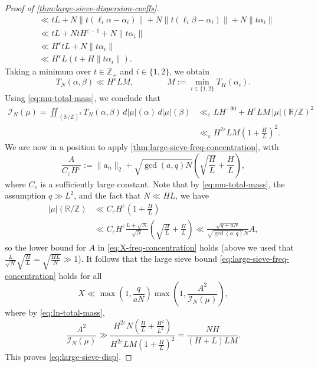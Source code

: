 \documentclass[reqno,11pt]{amsart}
\theoremstyle{remark}
\numberwithin{equation}{section}
\newcommand{\Z}{\mathbb{Z}}
\newcommand{\R}{\mathbb{R}}
\newcommand{\mI}{\mathcal{I}}
\newcommand{\eps}{\varepsilon}
\begin{document}
\begin{proof}[Proof of \cref{thm:large-sieve-dispersion-coeffs}]
\[\begin{aligned}
    &\ll 
    tL + N \|t(\ell_i \alpha - \alpha_i)\| + N \|t(\ell_i \beta - \alpha_i)\| + N \|t\alpha_i\|
    \\
    &\ll
    tL + N tH^{\eps-1} + N \|t\alpha_i\|
    \\
    &\ll 
    H^\eps t L + N\|t\alpha_i\|
    \\
    &\ll
    H^\eps L \left(t + H\|t\alpha_i\|\right).
\end{aligned}
\]
Taking a minimum over $t \in \Z_+$ and $i \in \{1, 2\}$, we obtain
\[
    T_N(\alpha, \beta) \ll H^\eps L M,
    \qquad\qquad 
    M := \min_{i \in \{1, 2\}} T_{H}(\alpha_i).
\]
Using \cref{eq:mu-total-mass}, we conclude that
\begin{equation} \label{eq:In-total-mass}
\begin{aligned}
    \mI_{N}(\mu) 
    =
    \iint_{(\R/\Z)^2} T_{N}(\alpha, \beta)\, d|\mu|(\alpha)\, d|\mu|(\beta) 
    &\ll_{\eps}
    L H^{-90}
    +
    H^\eps L M\, |\mu|(\R/\Z)^2
    \\
    &\ll_{\eps} 
    H^{2\eps} L M\left(1 + \frac{H}{L}\right)^2.
\end{aligned}
\end{equation}
We are now in a position to apply \cref{thm:large-sieve-freq-concentration}, with
\[
    \frac{A}{C_\eps H^\eps} := \|a_n\|_2 + \sqrt{\gcd(a, q) N} \left(\sqrt{\frac{H}{L}} + \frac{H}{L}\right),
\]
where $C_\eps$ is a sufficiently large constant.
Note that by \cref{eq:mu-total-mass}, the assumption $q \gg L^2$, and the fact that $N \ll HL$, we have
\[
\begin{aligned}
    |\mu|(\R/\Z)
    &\ll C_\eps H^\eps \left(1 + \frac{H}{L}\right)
    \\
    &\ll 
    C_\eps
    H^\eps
    \frac{L + \sqrt{N}}{\sqrt{N}} \left(\sqrt{\frac{H}{L}} + \frac{H}{L}\right)
    \ll
    \frac{\sqrt{q + aN}}{\sqrt{\gcd(a, q)} N} A,
\end{aligned}
\]
so the lower bound for $A$ in \cref{eq:X-freq-concentration} holds (above we used that $\frac{L}{\sqrt{N}} \sqrt{\frac{H}{L}} = \sqrt{\frac{HL}{N}} \gg 1$). It follows that the large sieve bound \cref{eq:large-sieve-freq-concentration} holds for all
\[
    X \ll \max \left(1, \frac{q}{aN}\right) \max\left(1, \frac{A^2}{\mI_{N}(\mu)}\right),
\]
where by \cref{eq:In-total-mass},
\[
    \frac{A^2}{\mI_{N}(\mu)} \gg \frac{H^{2\eps} N \left(\frac{H}{L} + \frac{H^2}{L^2}\right)}{H^{2\eps} L M\left(1 + \frac{H}{L}\right)^2} 
    =
    \frac{NH}{(H+L)LM}.  
\]
This proves \cref{eq:large-sieve-disp}.
\end{proof}
\end{document}

